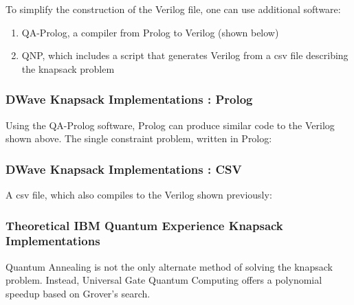 \documentclass{article}
\begin{document}
To simplify the construction of the Verilog file, one can use additional software:
\begin{enumerate}
    \item{QA-Prolog, a compiler from Prolog to Verilog (shown below)}
    \item{QNP, which includes a script that generates Verilog from a csv file describing the knapsack problem}
\end{enumerate}

\newpage

\subsubsection{DWave Knapsack Implementations : Prolog}

Using the QA-Prolog software, Prolog can produce similar code to the Verilog shown above.
The single constraint problem, written in Prolog:
\lstset{language=Prolog}


\subsubsection{DWave Knapsack Implementations : CSV}

A csv file, which also compiles to the Verilog shown previously:

\newpage

\subsubsection{Theoretical IBM Quantum Experience Knapsack Implementations}

Quantum Annealing is not the only alternate method of solving the knapsack problem.
Instead, Universal Gate Quantum Computing offers a polynomial speedup based on Grover's search.
\end{document}
